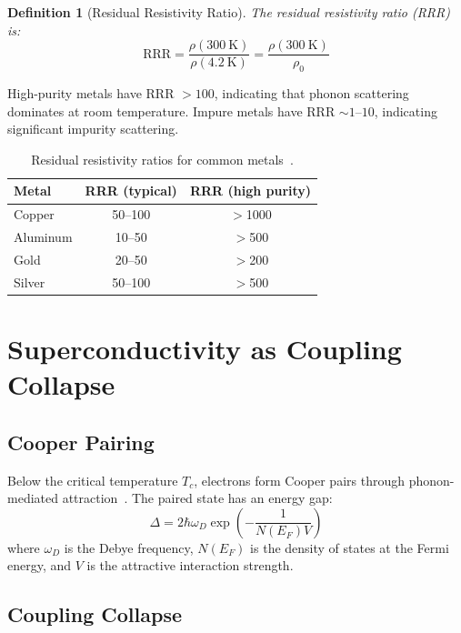 \documentclass[twocolumn,showpacs,preprintnumbers,amsmath,amssymb,prd]{revtex4-2}
\newtheorem{definition}[theorem]{Definition}
\begin{document}
\begin{definition}[Residual Resistivity Ratio]
\label{def:rrr}
The residual resistivity ratio (RRR) is:
\begin{equation}
\text{RRR} = \frac{\rho(300~\text{K})}{\rho(4.2~\text{K})} = \frac{\rho(300~\text{K})}{\rho_0}
\label{eq:rrr}
\end{equation}
\end{definition}

High-purity metals have RRR $> 100$, indicating that phonon scattering dominates at room temperature. Impure metals have RRR $\sim 1$--$10$, indicating significant impurity scattering.

\begin{table}[h]
\centering
\caption{Residual resistivity ratios for common metals~\cite{Haynes2016}.}
\label{tab:rrr}
\begin{tabular}{lcc}
\toprule
Metal & RRR (typical) & RRR (high purity) \\
\midrule
Copper & 50--100 & $>$1000 \\
Aluminum & 10--50 & $>$500 \\
Gold & 20--50 & $>$200 \\
Silver & 50--100 & $>$500 \\
\bottomrule
\end{tabular}
\end{table}


\section{Superconductivity as Coupling Collapse}
\label{sec:superconductivity}

\subsection{Cooper Pairing}

Below the critical temperature $T_c$, electrons form Cooper pairs through phonon-mediated attraction~\cite{BCS1957}. The paired state has an energy gap:
\begin{equation}
\Delta = 2\hbar\omega_D \exp\left(-\frac{1}{N(E_F)V}\right)
\label{eq:bcs_gap}
\end{equation}
where $\omega_D$ is the Debye frequency, $N(E_F)$ is the density of states at the Fermi energy, and $V$ is the attractive interaction strength.

\subsection{Coupling Collapse}
\end{document}
